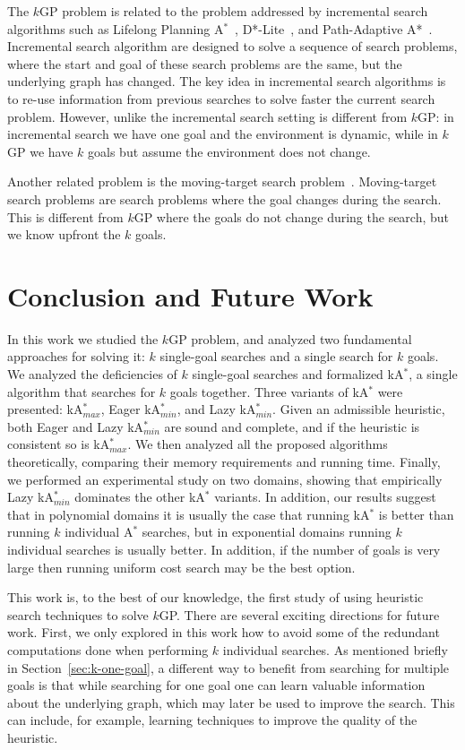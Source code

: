 \documentclass{aicom2e}
\newcommand{\kgs}{$k$GP}
\newcommand{\astar}{A$^*$}
\newcommand{\kastar}{kA$^*$}
\newcommand{\kastarmin}{kA$^*_{min}$}
\newcommand{\kastarmax}{kA$^*_{max}$}
\begin{document}
The \kgs{} problem is related to the problem addressed by incremental search algorithms such as Lifelong Planning \astar{}~\cite{koenig2004lifelong},  D*-Lite~\cite{koenig2005fast}, and Path-Adaptive A*~\cite{hernandez2015reusing}. Incremental search algorithm are designed to solve a sequence of search problems, where the start and goal of these search problems are the same, but the underlying graph has changed. The key idea in incremental search algorithms is to re-use information from previous searches to solve faster the current search problem. However, unlike the incremental search setting is different from \kgs{}: in incremental search we have one goal and the environment is dynamic, while in \kgs{} we have $k$ goals but assume the environment does not change.

Another related problem is the moving-target search problem~\cite{koenig2007speeding,ishida1991moving}. Moving-target search problems are search problems where the goal changes during the search. This is different from \kgs{} where the goals do not change during the search, but we know upfront the $k$ goals.


\section{Conclusion and Future Work}
In this work we studied the \kgs{} problem, and analyzed two fundamental approaches for solving it: $k$ single-goal searches and a single search for $k$ goals. We analyzed the deficiencies of $k$ single-goal searches and formalized \kastar{}, a single algorithm that searches for $k$ goals together. 
Three variants of \kastar{} were presented: \kastarmax{}, Eager \kastarmin{}, and Lazy \kastarmin{}. Given an admissible heuristic, both Eager and Lazy \kastarmin{} are sound and complete, and if the heuristic is consistent so is \kastarmax{}. We then analyzed all the proposed algorithms theoretically, comparing their memory requirements and running time. Finally, we performed an experimental study on two domains, showing that empirically Lazy \kastarmin{} dominates the other \kastar{} variants. In addition, our results suggest that 
in polynomial domains it is usually the case that running \kastar{} is better than running $k$ individual \astar{} searches, but in exponential domains running $k$ individual searches is usually better. In addition, if the number of goals is very large then running uniform cost search may be the best option. 


This work is, to the best of our knowledge, the first study of using heuristic search techniques to solve \kgs{}. There are several exciting directions for future work. First, we only explored in this work how to avoid some of the redundant computations done when performing $k$ individual searches. As mentioned briefly in Section~\ref{sec:k-one-goal}, a different way to benefit from searching for multiple goals is that while searching for one goal one can learn valuable information about the underlying graph, which may later be used to improve the search. This can include, for example, learning techniques to improve the quality of the heuristic. 
\end{document}
